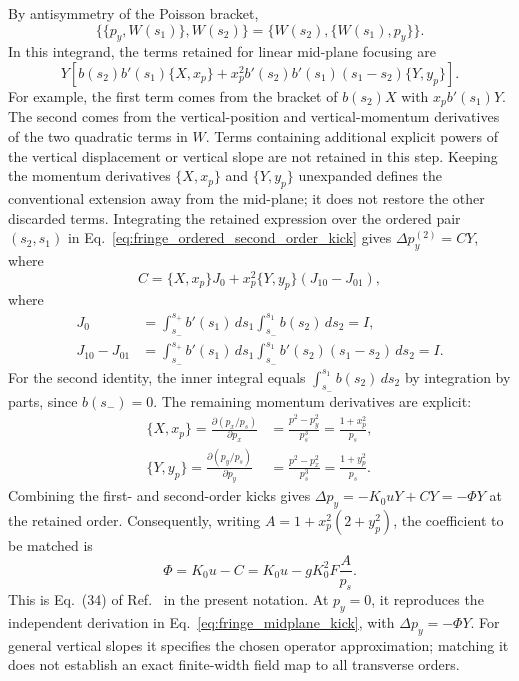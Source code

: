 By antisymmetry of the Poisson bracket,
\begin{equation}
 \bigl\{\{p_y,W(s_1)\},W(s_2)\bigr\}
 =\bigl\{W(s_2),\{W(s_1),p_y\}\bigr\}.
\end{equation}
In this integrand, the terms retained for linear mid-plane focusing are
\begin{equation}
 Y\left[b(s_2)b'(s_1)\{X,x_p\}
 +x_p^2 b'(s_2)b'(s_1)(s_1-s_2)\{Y,y_p\}\right].
\end{equation}
For example, the first term comes from the bracket of $b(s_2)X$ with
$x_p b'(s_1)Y$. The second comes from the vertical-position and
vertical-momentum derivatives of the two quadratic terms in $W$.
Terms containing additional explicit powers of the vertical displacement or
vertical slope are not retained in this step. Keeping the momentum
derivatives $\{X,x_p\}$ and $\{Y,y_p\}$ unexpanded defines the conventional
extension away from the mid-plane; it does not restore the other discarded
terms. Integrating the retained expression over the ordered pair
$(s_2,s_1)$ in Eq.~\eqref{eq:fringe_ordered_second_order_kick} gives
$\Delta p_y^{(2)}=CY$, where
\begin{equation}
 C=\{X,x_p\}J_0+x_p^2\{Y,y_p\}(J_{10}-J_{01}),
\end{equation}
where
\begin{align}
 J_0&=\int_{s_-}^{s_+} b'(s_1)\,ds_1\int_{s_-}^{s_1}b(s_2)\,ds_2=I,\\
 J_{10}-J_{01}
 &=\int_{s_-}^{s_+} b'(s_1)\,ds_1\int_{s_-}^{s_1}
       b'(s_2)(s_1-s_2)\,ds_2=I.
\end{align}
For the second identity, the inner integral equals
$\int_{s_-}^{s_1}b(s_2)\,ds_2$ by integration by parts, since $b(s_-)=0$.
The remaining momentum derivatives are explicit:
\begin{align}
 \{X,x_p\}=\frac{\partial (p_x/p_s)}{\partial p_x}
 &=\frac{p^2-p_y^2}{p_s^3}=\frac{1+x_p^2}{p_s},\\
 \{Y,y_p\}=\frac{\partial (p_y/p_s)}{\partial p_y}
 &=\frac{p^2-p_x^2}{p_s^3}=\frac{1+y_p^2}{p_s}.
\end{align}
Combining the first- and second-order kicks gives
$\Delta p_y=-K_0uY+CY=-\Phi Y$ at the retained order.
Consequently, writing $A=1+x_p^2(2+y_p^2)$, the coefficient to be matched is
\begin{equation}
 \Phi=K_0u-C=K_0u-gK_0^2F\frac{A}{p_s}.
\label{eq:fringe_phi_second_order}
\end{equation}
This is Eq.~(34) of Ref.~\cite{forest-fringe-1} in the present notation.
At $p_y=0$, it reproduces the independent derivation in
Eq.~\eqref{eq:fringe_midplane_kick}, with $\Delta p_y=-\Phi Y$.
For general vertical slopes it specifies the chosen operator approximation;
matching it does not establish an exact finite-width field map to all
transverse orders.

